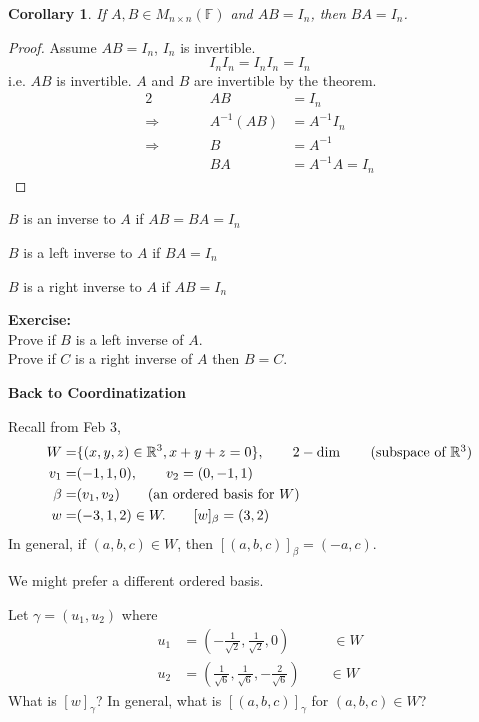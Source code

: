 \documentclass[12pt]{article}
\newtheorem{corollary}{Corollary}[subsection]
\newcommand{\mR}{{\mathbb{R}}}
\newcommand{\mF}{{\mathbb{F}}}
\begin{document}
	\begin{corollary}
		If $A,B \in M_{n\times n}(\mF)$ and $AB = I_n$, then $BA = I_n$. 
	\end{corollary}
	\begin{proof}
		Assume $AB = I_n$, $I_n$ is invertible. 
		\[
			I_nI_n = I_nI_n = I_n
		\]
		i.e. $AB$ is invertible. $A$ and $B$ are invertible by the theorem.
		\begin{alignat*}{2}
			& \qquad & AB &= I_n \\
			\Rightarrow & \qquad & A^{-1}(AB) &= A^{-1}I_n\\
			\Rightarrow & \qquad & B &= A^{-1} \\
						& &		BA &= A^{-1}A = I_n
		\end{alignat*}
	\end{proof}

	\begin{description}
		\item $B$ is an inverse to $A$ if $AB = BA = I_n$
		\item $B$ is a left inverse to $A$ if $BA = I_n$
		\item $B$ is a right inverse to $A$ if $AB = I_n$
	\end{description}

	\textbf{Exercise: }\\
	Prove if $B$ is a left inverse of $A$. \\ 
	Prove if $C$ is a right inverse of $A$ then $B = C$. 

	\textbf{Back to Coordinatization}
	
	Recall from Feb 3, 
	\begin{align*}
		W =& \{(x,y,z) \in \mR^3, x + y + z = 0\}, 
		\qquad 2-\dim \tag{subspace of $\mR^3$}\\
		v_1 =& (-1, 1, 0), \qquad v_2 = (0, -1, 1)\\
		\beta =& (v_1, v_2)		\tag{an ordered basis for $W$}\\
		w =& (-3, 1, 2) \in W. \qquad [w]_{\beta} = (3,2)
	\end{align*}
	In general, if $(a,b,c) \in W$, then $[(a,b,c)]_{\beta} = (-a, c)$. 

	We might prefer a different ordered basis.
	
	Let $\gamma = (u_1, u_2)$ where 
	\begin{align*}
		u_1 &= (-\frac1{\sqrt 2}, \frac1{\sqrt 2}, 0) 
		\qquad \quad \in W\\
		u_2 &= (\frac1{\sqrt 6}, \frac1{\sqrt 6}, -\frac{2}{\sqrt 6}) 
		\qquad \in W
	\end{align*}
	What is $[w]_{\gamma}$? 
	In general, what is $[(a,b,c)]_{\gamma}$ for $(a,b,c) \in W$? 
	
\end{document}
